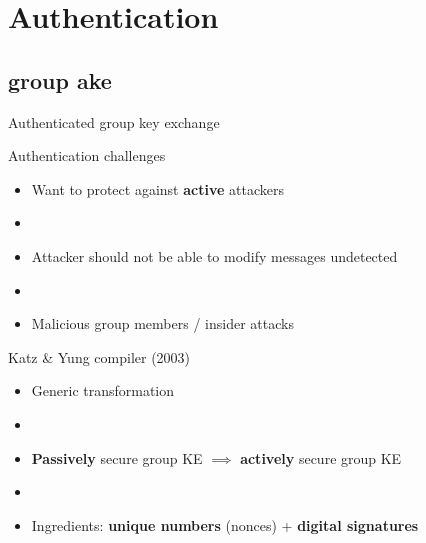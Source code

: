 \documentclass[screen, aspectratio=43,compress,dvipsnames]{beamer}
\makeatletter
\let\beamer@writeslidentry@miniframeson=\beamer@writeslidentry
\def\beamer@writeslidentry@miniframesoff{%
  \expandafter\beamer@ifempty\expandafter{\beamer@framestartpage}{}%
  {%
    \clearpage\beamer@notesactions%
  }
}
\newcommand*{\miniframeson}{\let\beamer@writeslidentry=\beamer@writeslidentry@miniframeson}
\newcommand*{\miniframesoff}{\let\beamer@writeslidentry=\beamer@writeslidentry@miniframesoff}
\makeatother
\begin{document}
\section{Authentication}
\subsection{group ake}


\miniframesoff
\begin{frame}
	
	\vfill
	\vfill
	\vfill
	\centering
	Authenticated group key exchange
	\vfill
	\vfill
	\vfill
\end{frame}
\miniframeson


\begin{frame}{Authentication challenges}

	\begin{itemize}			
		\item Want to protect against \textbf{active} attackers
	
		\item[]
		
		\item Attacker should not be able to modify messages undetected
		
		\item[]
	
		\item Malicious group members / insider attacks
		
	\end{itemize}
\end{frame}

\begin{frame}{Katz \& Yung compiler (2003) \nocite{C:KatYun03}}
	
	\begin{itemize}
		\item Generic transformation
		
		\item[]
		
		\item \textbf{Passively} secure group KE $\implies$ \textbf{actively} secure group KE 
		
		\item[]
		
		\item Ingredients: \textbf{unique numbers} (nonces) + \textbf{digital signatures} 
	\end{itemize}
	
\end{frame}
\end{document}
